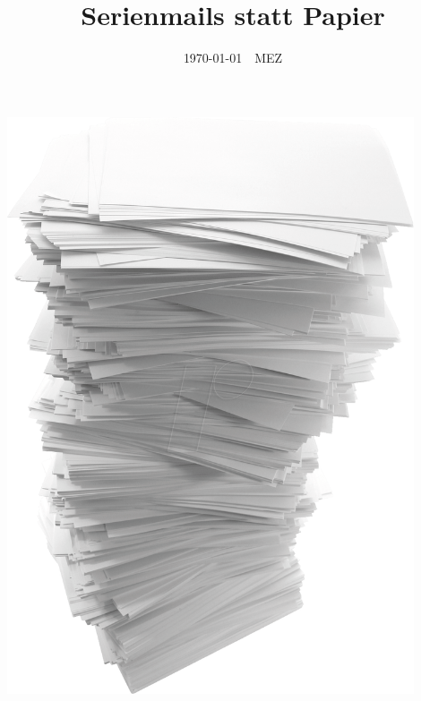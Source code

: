 \documentclass[12pt,twoside]{article}  %
\begin{document}
  \title{Serienmails statt Papier}
  \setlength{\parskip}{0ex}
  \date{\today \ \currenttime \ MEZ}
  \maketitle
  \begin{center}
	  \includegraphics[width=0.9\textwidth]{Titelbild.png}
  \end{center}
\end{document}
